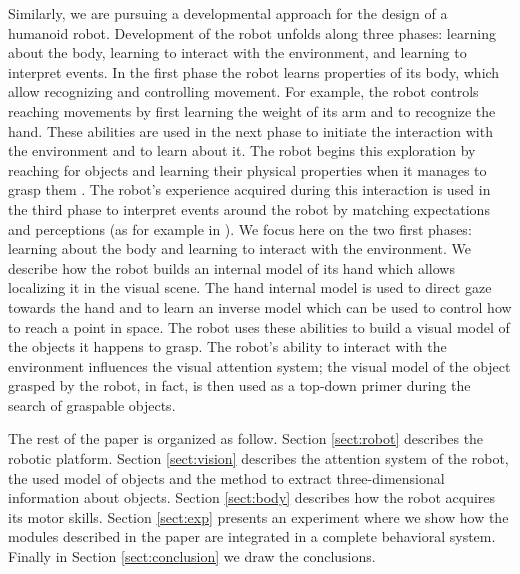 Similarly, we are pursuing a developmental approach for the design of a humanoid robot. Development of the robot unfolds along three phases: learning about the body, learning to interact with the environment, and learning to interpret events. In the first phase the robot learns properties of its body, which allow recognizing and controlling movement. For example, the robot controls reaching movements by first learning the weight of its arm and to recognize the hand. These abilities are used in the next phase to initiate the interaction with the environment and to learn about it. The robot begins this exploration by reaching for objects and learning their physical properties when it manages to grasp them \cite{natale04learning,natale05exploring,torres-jara05tapping}. The robot's experience acquired during this interaction is used in the third phase to interpret events around the robot by matching expectations and perceptions (as for example in \cite{metta03early}). We focus here on the two first phases: learning about the body and learning to interact with the environment. We describe how the robot builds an internal model of its hand which allows localizing it in the visual scene. The hand internal model is used to direct gaze towards the hand and to learn an inverse model which can be used to control how to reach a point in space. The robot uses these abilities to build a visual model of the objects it happens to grasp. The robot's ability to interact with the environment influences the visual attention system; the visual model of the object grasped by the robot, in fact, is then used as a top-down primer during the search of graspable objects.

The rest of the paper is organized as follow. Section \ref{sect:robot} describes the robotic platform. Section \ref{sect:vision} describes the attention system of the robot, the used model of objects and the method to extract three-dimensional information about objects. Section \ref{sect:body} describes how the robot acquires its motor skills. Section \ref{sect:exp} presents an experiment where we show how the modules described in the paper are integrated in a complete behavioral system. Finally in Section \ref{sect:conclusion} we draw the conclusions.
